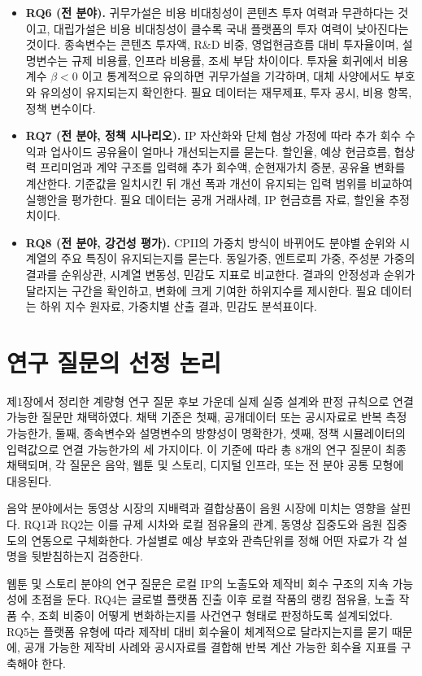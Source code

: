 \documentclass[11pt,a4paper]{report}
\begin{document}
\begin{itemize}[leftmargin=*, itemsep=0.6em]
  \item \textbf{RQ6 (전 분야).} 귀무가설은 비용 비대칭성이 콘텐츠 투자 여력과 무관하다는 것이고, 대립가설은 비용 비대칭성이 클수록 국내 플랫폼의 투자 여력이 낮아진다는 것이다. 종속변수는 콘텐츠 투자액, R\&D 비중, 영업현금흐름 대비 투자율이며, 설명변수는 규제 비용률, 인프라 비용률, 조세 부담 차이이다. 투자율 회귀에서 비용계수 $\beta < 0$ 이고 통계적으로 유의하면 귀무가설을 기각하며, 대체 사양에서도 부호와 유의성이 유지되는지 확인한다. 필요 데이터는 재무제표, 투자 공시, 비용 항목, 정책 변수이다.
  \item \textbf{RQ7 (전 분야, 정책 시나리오).} IP 자산화와 단체 협상 가정에 따라 추가 회수 수익과 업사이드 공유율이 얼마나 개선되는지를 묻는다. 할인율, 예상 현금흐름, 협상력 프리미엄과 계약 구조를 입력해 추가 회수액, 순현재가치 증분, 공유율 변화를 계산한다. 기준값을 일치시킨 뒤 개선 폭과 개선이 유지되는 입력 범위를 비교하여 실행안을 평가한다. 필요 데이터는 공개 거래사례, IP 현금흐름 자료, 할인율 추정치이다.
  \item \textbf{RQ8 (전 분야, 강건성 평가).} CPII의 가중치 방식이 바뀌어도 분야별 순위와 시계열의 주요 특징이 유지되는지를 묻는다. 동일가중, 엔트로피 가중, 주성분 가중의 결과를 순위상관, 시계열 변동성, 민감도 지표로 비교한다. 결과의 안정성과 순위가 달라지는 구간을 확인하고, 변화에 크게 기여한 하위지수를 제시한다. 필요 데이터는 하위 지수 원자료, 가중치별 산출 결과, 민감도 분석표이다.
\end{itemize}
\normalsize

\section{연구 질문의 선정 논리}
제1장에서 정리한 계량형 연구 질문 후보 가운데 실제 실증 설계와 판정 규칙으로 연결 가능한 질문만 채택하였다. 채택 기준은 첫째, 공개데이터 또는 공시자료로 반복 측정 가능한가, 둘째, 종속변수와 설명변수의 방향성이 명확한가, 셋째, 정책 시뮬레이터의 입력값으로 연결 가능한가의 세 가지이다. 이 기준에 따라 총 8개의 연구 질문이 최종 채택되며, 각 질문은 음악, 웹툰 및 스토리, 디지털 인프라, 또는 전 분야 공통 모형에 대응된다.

음악 분야에서는 동영상 시장의 지배력과 결합상품이 음원 시장에 미치는 영향을 살핀다. RQ1과 RQ2는 이를 규제 시차와 로컬 점유율의 관계, 동영상 집중도와 음원 집중도의 연동으로 구체화한다. 가설별로 예상 부호와 관측단위를 정해 어떤 자료가 각 설명을 뒷받침하는지 검증한다.

웹툰 및 스토리 분야의 연구 질문은 로컬 IP의 노출도와 제작비 회수 구조의 지속 가능성에 초점을 둔다. RQ4는 글로벌 플랫폼 진출 이후 로컬 작품의 랭킹 점유율, 노출 작품 수, 조회 비중이 어떻게 변화하는지를 사건연구 형태로 판정하도록 설계되었다. RQ5는 플랫폼 유형에 따라 제작비 대비 회수율이 체계적으로 달라지는지를 묻기 때문에, 공개 가능한 제작비 사례와 공시자료를 결합해 반복 계산 가능한 회수율 지표를 구축해야 한다.
\end{document}
